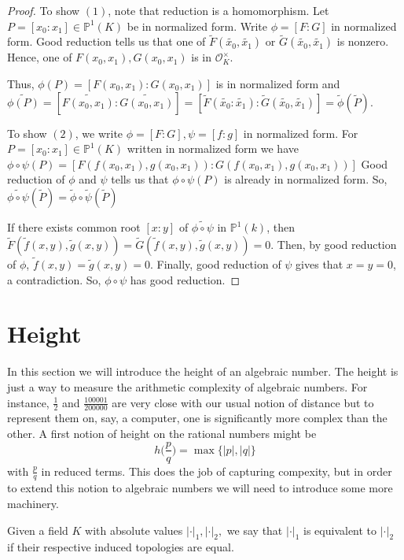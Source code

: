 \documentclass{amsart}
\newcommand{\MCO}{\mathcal{O}}
\begin{document}
\begin{proof}
To show $(1)$, note that reduction is a homomorphism.  Let $P=[x_0:x_1] \in \mathbb{P}^1(K) $ be in normalized form.   Write $\phi = [F:G]$ in normalized form.  
Good reduction tells us that one of $\tilde{F}(\tilde{x_0}, \tilde{x_1})$ or $\tilde{G}(\tilde{x_0}, \tilde{x_1})$ is nonzero.  Hence, one of $F(x_0,x_1), G(x_0,x_1)$ is in $\MCO_K^{\times}$. 

Thus, $\phi(P)=[F(x_0,x_1): G(x_0,x_1)]$ is in normalized form and $\widetilde{\phi(P)}=[\widetilde{F(x_0,x_1)}:\widetilde{G(x_0,x_1)}]=[\tilde{F}(\tilde{x_0}: \tilde{x_1}): \tilde{G}(\tilde{x_0}, \tilde{x_1})]=\tilde{\phi}(\tilde{P})$. 

To show $(2)$, we write $\phi=[F:G], \psi=[f:g]$ in normalized form. For $P=[x_0:x_1] \in \mathbb{P}^1(K)$ written in normalized form we have $\phi \circ \psi (P)=[F(f(x_0,x_1),g(x_0,x_1)):G(f(x_0,x_1),g(x_0,x_1))]$
Good reduction of $\phi$ and $\psi$ tells us that $\phi \circ \psi(P)$ is already in normalized form. So, $\widetilde{\phi \circ \psi}(\tilde{P})=\tilde{\phi}\circ \tilde{\psi}(\tilde{P})$

If there exists common root $[x:y]$ of $\widetilde{\phi \circ \psi}$ in $\mathbb{P}^1(k)$, then  $\tilde{F}(\tilde{f}(x,y),\tilde{g}(x,y))=\tilde{G}(\tilde{f}(x,y),\tilde{g}(x,y))=0$. Then, by good reduction of $\phi$, $\tilde{f}(x,y)=\tilde{g}(x,y)=0$. Finally, good reduction of $\psi$ gives that $x=y=0$, a contradiction.  So, $\phi \circ \psi$ has good reduction. 
\end{proof} 


\section{Height}

In this section we will introduce the height of an algebraic number. The height is just a way to measure the arithmetic complexity of algebraic numbers. For instance, $\frac{1}{2}$ and $\frac{100001}{200000}$ are very close with our usual notion of distance but to represent them on, say, a computer, one is significantly more complex than the other. A first notion of height on the rational numbers might be $$h\bigg(\frac{p}{q}\bigg) =  \max\{|p|,|q|\}$$ with $\frac{p}{q}$ in reduced terms. This does the job of capturing compexity, but in order to extend this notion to algebraic numbers we will need to introduce some more machinery.

Given a field $K$ with absolute values $|\cdot |_1, |\cdot |_2, $ we say that $|\cdot |_1$ is equivalent to $|\cdot |_2$ if their respective induced topologies are equal.  
\end{document}
